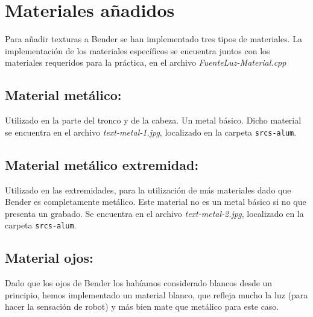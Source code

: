 \documentclass{article}
\begin{document}
\maketitle





\section{Materiales añadidos}
	Para añadir texturas a Bender se han implementado tres tipos de materiales. La implementación de los materiales específicos se encuentra juntos con los materiales requeridos para la práctica, en el archivo \textit{FuenteLuz-Material.cpp}
	 
	\subsection{Material metálico:}
	Utilizado en la parte del tronco y de la cabeza. Un metal básico. Dicho material se encuentra en el archivo \textit{text-metal-1.jpg}, localizado en la carpeta \texttt{srcs-alum}.
	
	\subsection{Material metálico extremidad:}
	Utilizado en las extremidades, para la utilización de más materiales dado que Bender es completamente metálico. Este material no es un metal básico si no que presenta un grabado. Se encuentra en el archivo \textit{text-metal-2.jpg}, localizado en la carpeta \texttt{srcs-alum}.

	\subsection{Material ojos:}
	Dado que los ojos de Bender los habíamos considerado blancos desde un principio, hemos implementado un material blanco, que refleja mucho la luz (para hacer la sensación de robot) y más bien mate que metálico para este caso.
	
\end{document}
